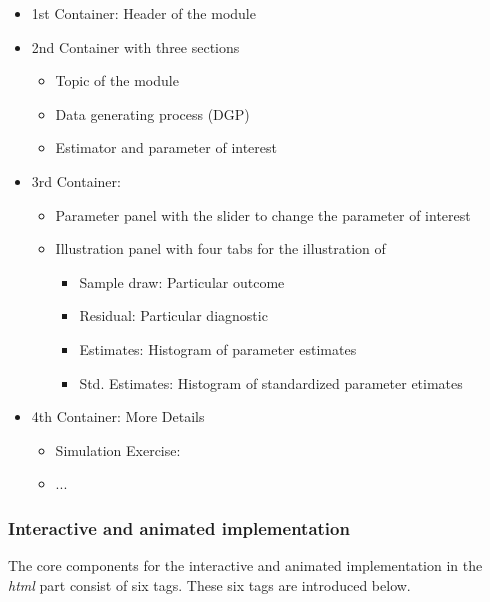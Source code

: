 \documentclass[12pt]{article}
\begin{document}
\begin{itemize}
	\item 1st Container: Header of the module
	\item 2nd Container with three sections
	\begin{itemize}
		\item Topic of the module
		\item Data generating process (DGP)
		\item Estimator and parameter of interest
	\end{itemize}
	\item 3rd Container:
	\begin{itemize}
		\item Parameter panel with the slider to change the parameter of interest
		\item Illustration panel with four tabs for the illustration of
		\begin{itemize}
			\item Sample draw: Particular outcome
			\item Residual: Particular diagnostic
			\item Estimates: Histogram of parameter estimates
			\item Std. Estimates: Histogram of standardized parameter etimates
		\end{itemize}
	\end{itemize}
	\item 4th Container: More Details
	\begin{itemize}
		\item Simulation Exercise:
		\item ...
	\end{itemize}
	
\end{itemize}



\subsubsection{Interactive and animated implementation}

The core components for the interactive and animated implementation in the \emph{html} part consist of six tags. 
%
These six tags are introduced below. 
\end{document}
